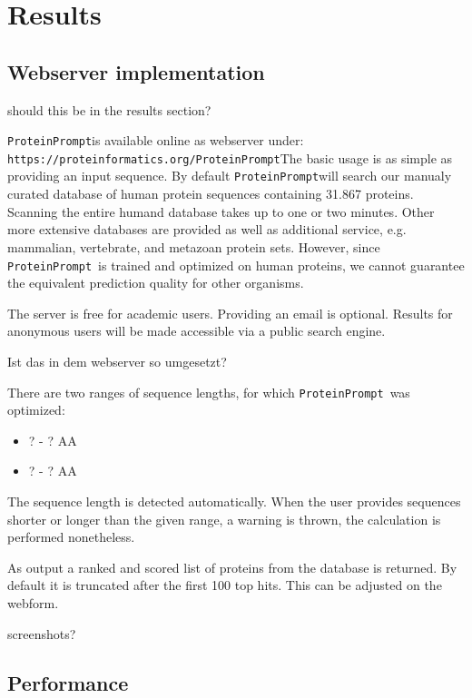 \documentclass[preprint,3p,times,twocolumn]{elsarticle}
\newcommand{\TODO}[1] {\begingroup\color{red}#1\endgroup}
\newcommand{\url}[1]{\texttt{https://\small #1}}
\newcommand{\tool}{\texttt{ProteinPrompt}\hspace{2pt}}
\newcommand{\website}{\url{proteinformatics.org/\tool}}
\begin{document}

\section{Results}

\subsection{Webserver implementation}
\TODO{should this be in the results section?}

\tool is available online as webserver under: \website The basic usage
is as simple as providing an input sequence. By default \tool will
search our manualy curated database of human protein sequences
containing 31.867 proteins. Scanning the entire humand database takes
up to one or two minutes. Other more extensive databases are provided
as well as additional service, e.g. mammalian, vertebrate, and
metazoan protein sets. However, since \tool\ is trained and optimized
on human proteins, we cannot guarantee the equivalent prediction
quality for other organisms. 

The server is free for academic users. Providing an email is
optional. Results for anonymous users will be made accessible via a
public search engine. 

\TODO{Ist das in dem webserver so umgesetzt?

There are two ranges of sequence lengths, for which \tool\ was
optimized: 
\begin{itemize}
\item \TODO{? - ?} AA
\item \TODO{? - ?} AA
\end{itemize}
}

The sequence length is detected automatically. When the user provides
sequences shorter or longer than the given range, a warning is thrown,
the calculation is performed nonetheless.

As output a ranked and scored list of proteins from the database is
returned. By default it is truncated after the first 100 top
hits. This can be adjusted on the webform. 

\TODO{ screenshots?}

\subsection{Performance}
\label{performance}
\end{document}

